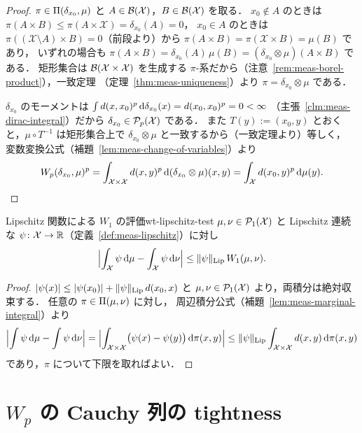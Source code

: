 \begin{proof}
  $\pi\in\Pi(\delta_{x_0},\mu)$ と
  $A\in\mathcal{B}(\mathcal{X})$，$B\in\mathcal{B}(\mathcal{X})$ を取る．
  $x_0\notin A$ のときは
  $\pi(A\times B)\leq\pi(A\times\mathcal{X})=\delta_{x_0}(A)=0$，
  $x_0\in A$ のときは
  $\pi((\mathcal{X}\setminus A)\times B)=0$（前段より）から
  $\pi(A\times B)=\pi(\mathcal{X}\times B)=\mu(B)$ であり，
  いずれの場合も
  $\pi(A\times B)=\delta_{x_0}(A)\,\mu(B)
  =(\delta_{x_0}\otimes\mu)(A\times B)$ である．
  矩形集合は $\mathcal{B}(\mathcal{X}\times\mathcal{X})$ を生成する
  $\pi$-系だから（注意~\ref{rem:meas-borel-product}），一致定理
  （定理~\ref{thm:meas-uniqueness}）より
  $\pi=\delta_{x_0}\otimes\mu$ である．

  $\delta_{x_0}$ のモーメントは
  $\int d(x,x_0)^p\,\mathrm{d}\delta_{x_0}(x)=d(x_0,x_0)^p=0<\infty$
  （主張~\ref{clm:meas-dirac-integral}）だから
  $\delta_{x_0}\in\mathcal{P}_{p}(\mathcal{X})$ である．
  また $T(y):=(x_0,y)$ とおくと，$\mu\circ T^{-1}$ は矩形集合上で
  $\delta_{x_0}\otimes\mu$ と一致するから（一致定理より）等しく，
  変数変換公式（補題~\ref{lem:meas-change-of-variables}）より
  \[
    W_p(\delta_{x_0},\mu)^p
    =\int_{\mathcal{X}\times\mathcal{X}}d(x,y)^p
      \,\mathrm{d}(\delta_{x_0}\otimes\mu)(x,y)
    =\int_{\mathcal{X}}d(x_0,y)^p\,\mathrm{d}\mu(y).  \qedhere
  \]
\end{proof}

\begin{lemma}{Lipschitz 関数による $W_1$ の評価}{wt-lipschitz-test}
  $\mu,\nu\in\mathcal{P}_{1}(\mathcal{X})$ と Lipschitz 連続な
  $\psi\colon\mathcal{X}\to\mathbb{R}$（定義~\ref{def:meas-lipschitz}）に対し
  \[
    \Bigl|\int_{\mathcal{X}}\psi\,\mathrm{d}\mu-\int_{\mathcal{X}}\psi\,\mathrm{d}\nu\Bigr|
    \leq\lVert \psi \rVert_{\operatorname{Lip}}\,W_1(\mu,\nu).
  \]
\end{lemma}

\begin{proof}
  $\lvert \psi(x) \rvert\leq\lvert \psi(x_0) \rvert+\lVert \psi \rVert_{\operatorname{Lip}}\,d(x_0,x)$ と
  $\mu,\nu\in\mathcal{P}_{1}(\mathcal{X})$ より，両積分は絶対収束する．
  任意の $\pi\in\Pi(\mu,\nu)$ に対し，
  周辺積分公式（補題~\ref{lem:meas-marginal-integral}）より
  \[
    \Bigl|\int\psi\,\mathrm{d}\mu-\int\psi\,\mathrm{d}\nu\Bigr|
    =\Bigl|\int_{\mathcal{X}\times\mathcal{X}}
      \bigl(\psi(x)-\psi(y)\bigr)\,\mathrm{d}\pi(x,y)\Bigr|
    \leq\lVert \psi \rVert_{\operatorname{Lip}}
      \int_{\mathcal{X}\times\mathcal{X}}d(x,y)\,\mathrm{d}\pi(x,y)
  \]
  であり，$\pi$ について下限を取ればよい．
\end{proof}

\section{$W_p$ の Cauchy 列の tightness}
\label{sec:wt-cauchy}

